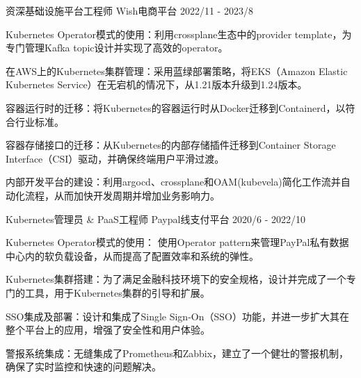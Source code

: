 

\begin{cventries}

\cventry
  {资深基础设施平台工程师} %
  {Wish电商平台} %
  {} %
  {2022/11 - 2023/8} %
  {
    \begin{cvitems} %
      \item {Kubernetes Operator模式的使用：利用crossplane生态中的provider template，为专门管理Kafka topic设计并实现了高效的operator。}
      \item {在AWS上的Kubernetes集群管理：采用蓝绿部署策略，将EKS（Amazon Elastic Kubernetes Service）在无宕机的情况下，从1.21版本升级到1.24版本。}
      \item {容器运行时的迁移：将Kubernetes的容器运行时从Docker迁移到Containerd，以符合行业标准。}
      \item {容器存储接口的迁移：从Kubernetes的内部存储插件迁移到Container Storage Interface（CSI）驱动，并确保终端用户平滑过渡。}
      \item {内部开发平台的建设：利用argocd、crossplane和OAM(kubevela)简化工作流并自动化流程，从而加快开发周期并增加业务影响力。}
    \end{cvitems}
  }
  
  \cventry
    {Kubernetes管理员 \& PaaS工程师} %
    {Paypal线支付平台} %
    {} %
    {2020/6 - 2022/10} %
    {
      \begin{cvitems} %
        \item {Kubernetes Operator模式的使用： 使用Operator pattern来管理PayPal私有数据中心内的软负载设备，从而提高了配置效率和系统的弹性。}
        \item {Kubernetes集群搭建：为了满足金融科技环境下的安全规格，设计并完成了一个专门的工具，用于Kubernetes集群的引导和扩展。}
        \item {SSO集成及部署：设计和集成了Single Sign-On（SSO）功能，并进一步扩大其在整个平台上的应用，增强了安全性和用户体验。        }
        \item {警报系统集成：无缝集成了Prometheus和Zabbix，建立了一个健壮的警报机制，确保了实时监控和快速的问题解决。 }
      \end{cvitems}
    }











\end{cventries}

